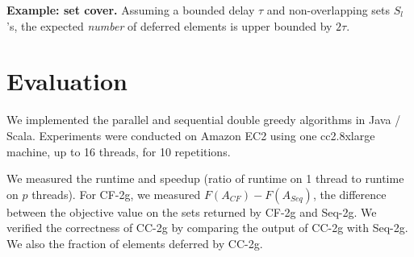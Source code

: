 \documentclass{article} %
\newcommand{\hogwild}{CF-2g}
\newcommand{\occ}{CC-2g}
\newcommand{\seqalg}{Seq-2g}
\newcommand{\hogwildshort}{CF}
\newcommand{\seqalgshort}{Seq}
\begin{document}
\textbf{Example: set cover.}
Assuming a bounded delay $\tau$ and non-overlapping sets $S_l$'s, the expected \emph{number} of deferred elements is upper bounded by $2\tau$.

















\section{Evaluation \label{sec:evaluation}}

We implemented the parallel and sequential double greedy algorithms in Java / Scala.
Experiments were conducted on Amazon EC2 using one cc2.8xlarge machine, up to 16 threads, for 10 repetitions.

We measured the runtime and speedup (ratio of runtime on 1 thread to runtime on $p$ threads).
For \hogwild{}, we measured $F(A_{\hogwildshort})-F(A_{\seqalgshort})$, the difference between the objective value on the sets returned by \hogwild{} and \seqalg{}.
We verified the correctness of \occ{} by comparing the output of \occ{} with \seqalg{}.
We also the fraction of elements deferred by \occ{}.

\end{document}
